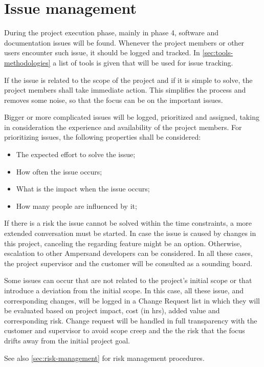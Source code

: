 
\section{Issue management}
\label{sec:issue-management}
During the project execution phase, mainly in phase 4, software and documentation issues will be found.
Whenever the project members or other users encounter such issue, it should be logged and tracked.
In \autoref{sec:tools-methodologies} a list of tools is given that will be used for issue tracking.

If the issue is related to the scope of the project and if it is simple to solve, the project members shall take immediate action.
This simplifies the process and removes some noise, so that the focus can be on the important issues.

Bigger or more complicated issues will be logged, prioritized and assigned, taking in consideration the experience and availability of the project members.
For prioritizing issues, the following properties shall be considered:
\begin{itemize}
	\item The expected effort to solve the issue;
	\item How often the issue occurs;
	\item What is the impact when the issue occurs;
	\item How many people are influenced by it;
\end{itemize}

If there is a risk the issue cannot be solved within the time constraints, a more extended conversation must be started.
In case the issue is caused by changes in this project, canceling the regarding feature might be an option.
Otherwise, escalation to other Ampersand developers can be considered.
In all these cases, the project supervisor and the customer will be consulted as a sounding board.

Some issues can occur that are not related to the project's initial scope or that introduce a deviation from the initial scope.
In this case, all these issue, and corresponding changes, will be logged in a Change Request list in which they will be evaluated based on project impact, cost (in hrs), added value and corresponding risk. 
Change request will be handled in full transparency with the customer and supervisor to avoid scope creep and the the risk that the focus drifts away from the initial project goal.

See also \autoref{sec:risk-management} for risk management procedures.
